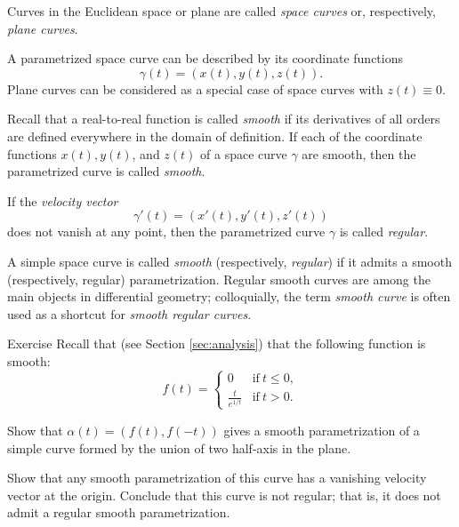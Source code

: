 Curves in the Euclidean space or plane are called \emph{space curves} or, respectively, \emph{plane curves}.

A parametrized space curve can be described by its coordinate functions 
\[\gamma(t)=(x(t),y(t),z(t)).\]
Plane curves can be considered as a special case of space curves with $z(t)\equiv 0$.

Recall that a real-to-real function is called \emph{smooth} if its derivatives of all orders are defined everywhere in the domain of definition.  
If each of the coordinate functions $x(t), y(t)$, and $z(t)$ of a space curve $\gamma$ are smooth, then the parametrized curve is called \emph{smooth}.

If the \emph{velocity vector} 
\[\gamma'(t)=(x'(t),y'(t),z'(t))\] 
does not vanish at any point, then the parametrized curve $\gamma$ is called \emph{regular}.\label{page:regular curve}

A simple space curve is called \emph{smooth} (respectively, {}\emph{regular}) if it admits a smooth (respectively, regular) parametrization.
Regular smooth curves are among the main objects in differential geometry;
colloquially, the term \emph{smooth curve} is often used as a shortcut for {}\emph{smooth regular curves}. 

\begin{thm}{Exercise}\label{ex:L-shape}
Recall that (see Section \ref{sec:analysis}) that the following function is smooth: 
\[f(t)=
\begin{cases}
0&\text{if}\ t\le 0,
\\
\frac{t}{e^{1\!/\!t}}&\text{if}\ t> 0.
\end{cases}
\]

Show that $\alpha(t)=(f(t),f(-t))$ gives a smooth parametrization of a simple curve formed by the union of two half-axis in the plane.

Show that any smooth parametrization of this curve has a vanishing velocity vector at the origin.
Conclude that this curve is not regular;
that is, it does not admit a regular smooth parametrization.
\end{thm}


